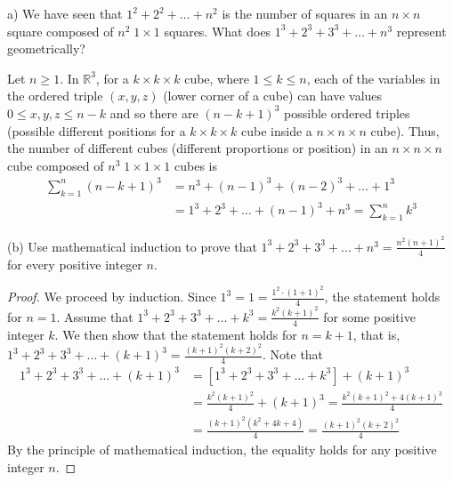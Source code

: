 \documentclass[12pt]{article}
\newcommand{\R}{\mathbb{R}}
\newenvironment{problem}[2][Problem]{\begin{trivlist}
		\item[\hskip \labelsep {\bfseries #1}\hskip \labelsep {\bfseries #2.}]}{\end{trivlist}}
\newenvironment{solution}[2][Solution]{\begin{trivlist}
		\item[\hskip \labelsep {\bfseries #1}\hskip \labelsep {\bfseries #2.}]}{\end{trivlist}}
\begin{document}
\begin{problem}{6}
	(a) We have seen that $1^{2}+2^{2}+\ldots+n^{2}$ is the number of squares in an $n\times n$ square composed of $n^{2} \; 1\times 1$ squares. What does $1^{3}+2^{3}+3^{3}+\ldots+n^{3}$ represent geometrically?
	\begin{solution}{}
		Let $n\geq 1$. In $\R^{3}$, for a $k\times k \times k$ cube, where $1\leq k \leq n$, each of the variables in the ordered triple $(x,y,z)$ (lower corner of a cube) can have values $0\leq x,y,z\leq n-k$ and so there are $(n-k+1)^{3}$ possible  ordered triples (possible different positions for a $k\times k\times k$ cube inside a $n\times n\times n$ cube). Thus, the number of different cubes (different proportions or position) in an $n\times n \times n$ cube composed of $n^{3} \; 1\times 1 \times 1$ cubes is
		\begin{align*}
			\sum\limits_{k=1}^{n}(n-k+1)^{3} &= n^{3}+(n-1)^{3}+(n-2)^{3}+\ldots+1^{3}\\
			&= 1^{3}+2^{3}+\ldots+(n-1)^{3}+n^{3} = \sum\limits_{k=1}^{n} k^{3}
		\end{align*}
	\end{solution}

	(b) Use mathematical induction to prove that $1^{3}+2^{3}+3^{3}+\ldots+n^{3} = \frac{n^{2}(n+1)^{2}}{4}$ for every positive integer $n$.
	\begin{proof}
		We proceed by induction. Since $1^{3} = 1 = \frac{1^{2}\cdot (1+1)^{2}}{4}$, the statement holds for $n=1$. Assume that $1^{3}+2^{3}+3^{3}+\ldots + k^{3} = \frac{k^{2}(k+1)^{2}}{4}$ for some positive integer $k$. We then show that the statement holds for $n=k+1$, that is, $1^{3}+2^{3}+3^{3}+\ldots+(k+1)^{3}=\frac{(k+1)^{2}(k+2)^{2}}{4}$. Note that 
		\begin{align*}
			1^{3}+2^{3}+3^{3}+\ldots+ (k+1)^{3} &= [1^{3}+2^{3}+3^{3}+\ldots+k^{3}]+(k+1)^{3}\\
			&= \frac{k^{2}(k+1)^{2}}{4} + (k+1)^{3} = \frac{k^{2}(k+1)^{2}+4(k+1)^{3}}{4}\\
			&= \frac{(k+1)^{2}(k^{2}+4k+4)}{4} = \frac{(k+1)^{2}(k+2)^{2}}{4}
		\end{align*}
	By the principle of mathematical induction, the equality holds for any positive integer $n$.
	\end{proof} 
\end{problem}
\end{document}
